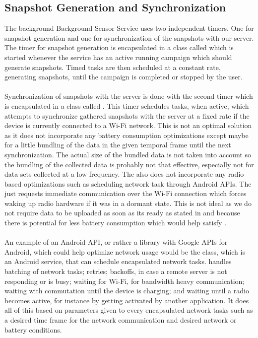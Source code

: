 \subsection{Snapshot Generation and Synchronization}
\label{sub:background_sensor_service_snapshot_generation_and_synchronization}

The background Background Sensor Service uses two independent timers. One for snapshot generation and one for synchronization of the snapshots with our server. The timer for snapshot generation is encapsulated in a class called  which is started whenever the service has an active running campaign which should generate snapshots. Timed tasks are then scheduled at a constant rate, generating snapshots, until the campaign is completed or stopped by the user.
\\\\
Synchronization of snapshots with the server is done with the second timer which is encapsulated in a class called . This timer schedules tasks, when active, which attempts to synchronize gathered snapshots with the server at a fixed rate if the device is currently connected to a Wi-Fi network. This is not an optimal solution as it does not incorporate any battery consumption optimizations except maybe for a little bundling of the data in the given temporal frame until the next synchronization. The actual size of the bundled data is not taken into account so the bundling of the collected data is probably not that effective, especially not for data sets collected at a low frequency. The  also does not incorporate any radio based optimizations such as scheduling network task through Android APIs. The  just requests immediate communication over the Wi-Fi connection which forces waking up radio hardware if it was in a dormant state. This is not ideal as we do not require data to be uploaded as soon as its ready as stated in  and because there is potential for less battery consumption which would help satisfy . 
\\\\
An example of an Android API, or rather a library with Google APIs for Android, which could help optimize network usage would be the  class, which is an Android service, that can schedule encapsulated network tasks.  \parencite{gcmnetworkmanager} handles batching of network tasks; retries; backoffs, in case a remote server is not responding or is busy; waiting for Wi-Fi, for bandwidth heavy communication; waiting with commutation until the device is charging; and waiting until a radio becomes active, for instance by getting activated by another application. It does all of this based on parameters given to every encapsulated network tasks such as a desired time frame for the network communication and desired network or battery conditions.  
